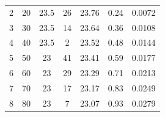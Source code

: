 \documentclass{article}
\begin{document}
\begin{table}[h!]
\begin{tabular}{ccccccc}
2      & 20                                                           & 23.5                                                                              & 26                                                                            & 23.76                                            & 0.24            & 0.0072                                  \\ 
3      & 30                                                           & 23.5                                                                              & 14                                                                           & 23.64                                            & 0.36            & 0.0108                                  \\ 
4      & 40                                                           & 23.5                                                                              & 2                                                                           & 23.52                                            & 0.48            & 0.0144                                  \\ 
5      & 50                                                           & 23                                                                              & 41                                                                            & 23.41                                            & 0.59            & 0.0177                                 \\ 
6      & 60                                                           & 23                                                                              & 29                                                                           & 23.29                                            & 0.71            & 0.0213                                  \\ 
7      & 70                                                           & 23                                                                              & 17                                                                           & 23.17                                            & 0.83            & 0.0249                                 \\ 
8      & 80                                                           & 23                                                                              & 7                                                                           & 23.07                                            & 0.93            & 0.0279                                 \\ 

\end{tabular}
\end{table}
\end{document}
